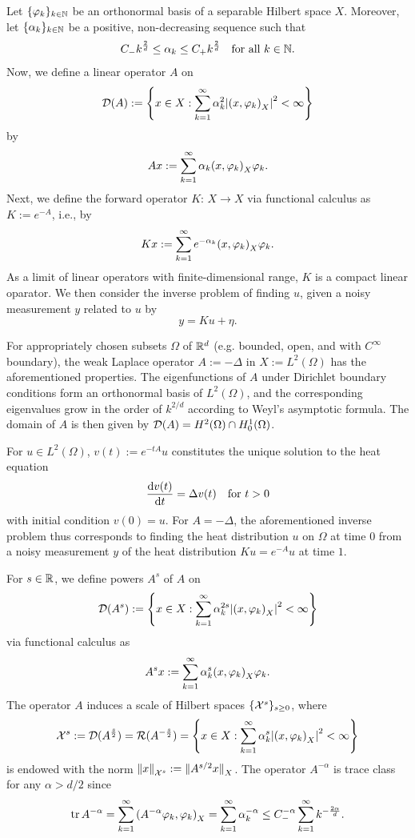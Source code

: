 \documentclass[english]{jnsao}
\theoremstyle{definition}
\begin{document}
Let $\{\varphi_k\}_{k\in\mathbb{N}}$ be an orthonormal basis of a separable Hilbert space $X$. Moreover, let $\{\alpha_k\}_{k\in\mathbb{N}}$ be a positive, non-decreasing sequence such that
\[
	C_- k^\frac{2}{d} \le \alpha_k \le C_+ k^\frac{2}{d} \quad \text{for all }k \in \mathbb{N}.
\]
Now, we define a linear operator $A$ on
\[
	\operatorname{\mathcal{D}}(A) := \left\{ x \in X: \sum_{k=1}^\infty \alpha_k^2 {\lvert{(x,\varphi_k)}_X\rvert}^2 < \infty \right\}
\]
by
\[
	Ax := \sum_{k=1}^\infty \alpha_k {(x,\varphi_k)}_X \varphi_k.
\]
Next, we define the forward operator $K$: $X \to X$ via functional calculus as $K := e^{-A}$, i.e., by
\[
	Kx := \sum_{k=1}^\infty e^{-\alpha_k} {(x,\varphi_k)}_X \varphi_k.
\]
As a limit of linear operators with finite-dimensional range, $K$ is a compact linear oparator.
We then consider the inverse problem of finding $u$, given a noisy measurement $y$ related to $u$ by
\begin{equation*}
	y = Ku + \eta.
\end{equation*}

\begin{example}
	For appropriately chosen subsets $\Omega$ of ${\mathbb{R}}^d$ (e.g. bounded, open, and with $C^\infty$ boundary), the weak Laplace operator $A := -\Delta$ in $X := L^2(\Omega)$ has the aforementioned properties. The eigenfunctions of $A$ under Dirichlet boundary conditions form an orthonormal basis of $L^2(\Omega)$, and the corresponding eigenvalues grow in the order of $k^{2/d}$ according to Weyl's asymptotic formula. The domain of $A$ is then given by $\operatorname{\mathcal{D}}(A) = H^2(\Omega) \cap H_0^1(\Omega)$.
	
	For $u \in L^2(\Omega)$, $v(t) := e^{-tA}u$ constitutes the unique solution to the heat equation
	\[ \frac{\mathrm{d} v(t)}{\mathrm{d} t} = \Delta v(t) \quad \text{for}~t > 0 \]
	with initial condition $v(0) = u$. For $A = -\Delta$, the aforementioned inverse problem thus corresponds to finding the heat distribution $u$ on $\Omega$ at time $0$ from a noisy measurement $y$ of the heat distribution $Ku = e^{-A}u$ at time $1$.
\end{example}

For $s \in {\mathbb{R}}$, we define powers $A^s$ of $A$ on
\[
	\operatorname{\mathcal{D}}(A^{s}) := \left\{ x \in X: \sum_{k=1}^\infty \alpha_k^{2s} {\lvert{(x,\varphi_k)}_X\rvert}^2 < \infty \right\}
\]
via functional calculus as
\[
	A^s x := \sum_{k=1}^\infty \alpha_k^s {(x,\varphi_k)}_X \varphi_k.
\]
The operator $A$ induces a scale of Hilbert spaces $\{{\mathcal{X}^{s}}\}_{s \ge 0}$, where
\[ {\mathcal{X}^{s}} := \operatorname{\mathcal{D}}(A^\frac{s}{2}) = \operatorname{\mathcal{R}}(A^{-\frac{s}{2}}) = \left\{ x \in X: \sum_{k=1}^\infty \alpha_k^s {\lvert{(x,\varphi_k)}_X\rvert}^2 < \infty \right\} \]
is endowed with the norm ${\lVert x\rVert}_{\mathcal{X}^{s}} := {\lVert A^{s/2}x\rVert}_X$.
The operator $A^{-\alpha}$ is trace class for any $\alpha > d/2$ since
\begin{equation}
	\label{eq:pow_A_trace_class}
	\operatorname{tr} A^{-\alpha} = \sum_{k=1}^\infty {(A^{-\alpha}\varphi_k,\varphi_k)}_X = \sum_{k=1}^\infty \alpha_k^{-\alpha} \le C_-^{-\alpha} \sum_{k=1}^\infty k^{-\frac{2\alpha}{d}}.
\end{equation}
\end{document}
